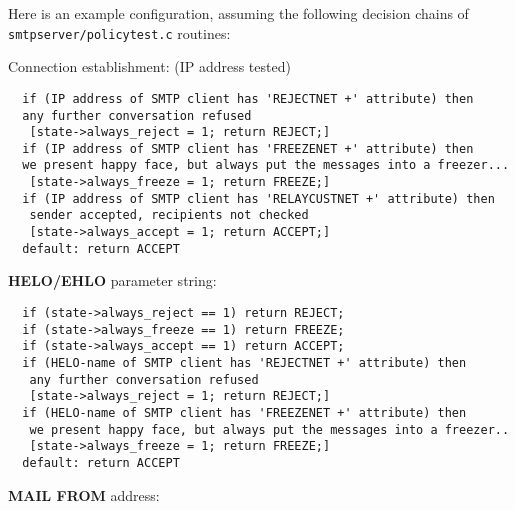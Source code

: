 Here is an example configuration, assuming the following decision 
chains of {\tt smtpserver/policytest.c} routines:

Connection establishment:  (IP address tested)

\begin{tscreen}
\begin{verbatim}
  if (IP address of SMTP client has 'REJECTNET +' attribute) then
  any further conversation refused
   [state->always_reject = 1; return REJECT;]
  if (IP address of SMTP client has 'FREEZENET +' attribute) then
  we present happy face, but always put the messages into a freezer...
   [state->always_freeze = 1; return FREEZE;]
  if (IP address of SMTP client has 'RELAYCUSTNET +' attribute) then
   sender accepted, recipients not checked
   [state->always_accept = 1; return ACCEPT;]
  default: return ACCEPT
\end{verbatim}
\end{tscreen}


{\bf HELO/EHLO} parameter string:

\begin{tscreen}
\begin{verbatim}
  if (state->always_reject == 1) return REJECT;
  if (state->always_freeze == 1) return FREEZE;
  if (state->always_accept == 1) return ACCEPT;
  if (HELO-name of SMTP client has 'REJECTNET +' attribute) then
   any further conversation refused
   [state->always_reject = 1; return REJECT;]
  if (HELO-name of SMTP client has 'FREEZENET +' attribute) then
   we present happy face, but always put the messages into a freezer..
   [state->always_freeze = 1; return FREEZE;]
  default: return ACCEPT
\end{verbatim}
\end{tscreen}


{\bf MAIL FROM} address:

